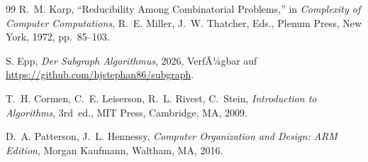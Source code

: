 ﻿\documentclass[12pt, a4paper]{article}
\theoremstyle{plain}
\theoremstyle{definition}
\theoremstyle{remark}
\begin{document}
\begin{thebibliography}{99}
R.~M. Karp,
``Reducibility Among Combinatorial Problems,''
in \textit{Complexity of Computer Computations}, R.~E. Miller, J.~W. Thatcher, Eds.,
Plenum Press, New York, 1972, pp.~85--103.

S. Epp,
\textit{Der Subgraph Algorithmus}, 2026, VerfÃ¼gbar auf \url{https://github.com/hjstephan86/subgraph}.

T.~H. Cormen, C.~E. Leiserson, R.~L. Rivest, C.~Stein,
\textit{Introduction to Algorithms}, 3rd~ed.,
MIT Press, Cambridge, MA, 2009.

D.~A. Patterson, J.~L. Hennessy,
\textit{Computer Organization and Design: ARM Edition},
Morgan Kaufmann, Waltham, MA, 2016.

\end{thebibliography}
\end{document}
